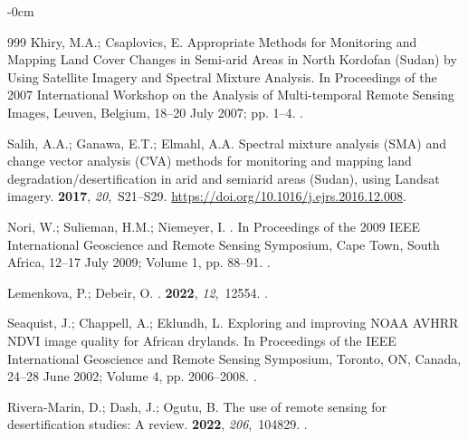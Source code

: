 \documentclass[jimaging,article,accept,pdftex,moreauthors]{Definitions/mdpi}
\begin{document}
\begin{adjustwidth}{-\extralength}{0cm}
\begin{thebibliography}{999}
Khiry, M.A.; Csaplovics, E.
\newblock Appropriate Methods for Monitoring and Mapping Land Cover Changes in
  Semi-arid Areas in North Kordofan (Sudan) by Using Satellite Imagery and
  Spectral Mixture Analysis.
\newblock In Proceedings of the 2007 International Workshop on the Analysis of
  Multi-temporal Remote Sensing Images, Leuven, Belgium, 18--20 July 2007; pp. 1--4.
.

Salih, A.A.; Ganawa, E.T.; Elmahl, A.A.
\newblock Spectral mixture analysis (SMA) and change vector analysis (CVA)
  methods for monitoring and mapping land degradation/desertification in arid
  and semiarid areas (Sudan), using Landsat imagery.
 {\bf
  2017}, {\em 20},~S21--S29.
  {\url{https://doi.org/10.1016/j.ejrs.2016.12.008}}.

Nori, W.; Sulieman, H.M.; Niemeyer, I.
.
\newblock In Proceedings of the 2009 IEEE International Geoscience and Remote
  Sensing Symposium, Cape Town, South Africa, 12--17 July 2009; Volume 1, pp. 88--91.
.

Lemenkova, P.; Debeir, O.
.
 {\bf 2022}, {\em 12},~12554.
.

Seaquist, J.; Chappell, A.; Eklundh, L.
\newblock Exploring and improving NOAA AVHRR NDVI image quality for African
  drylands.
\newblock In Proceedings of the IEEE International Geoscience and Remote
  Sensing Symposium, Toronto, ON, Canada, 24--28 June 2002; Volume 4, pp. 2006--2008.
.

Rivera-Marin, D.; Dash, J.; Ogutu, B.
\newblock The use of remote sensing for desertification studies: A review.
 {\bf 2022}, {\em 206},~104829.
.


\end{thebibliography}
\end{adjustwidth}
\end{document}
